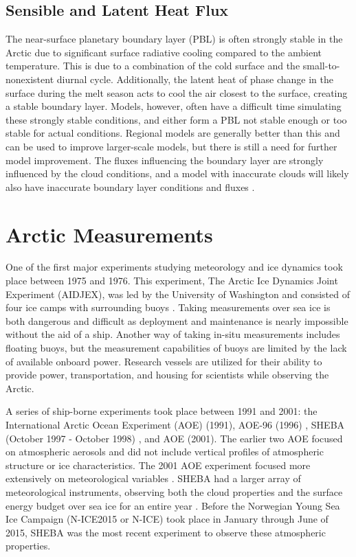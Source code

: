 \subsection{Sensible and Latent Heat Flux}
The near-surface planetary boundary layer (PBL) is often strongly stable in the Arctic due to significant surface radiative cooling compared to the ambient temperature. This is due to a combination of the cold surface and the small-to-nonexistent diurnal cycle. Additionally, the latent heat of phase change in the surface during the melt season acts to cool the air closest to the surface, creating a stable boundary layer. Models, however, often have a difficult time simulating these strongly stable conditions, and either form a PBL not stable enough or too stable for actual conditions. Regional models are generally better than this and can be used to improve larger-scale models, but there is still a need for further model improvement. The fluxes influencing the boundary layer are strongly influenced by the cloud conditions, and a model with inaccurate clouds will likely also have inaccurate boundary layer conditions and fluxes \citep{tjernstrom:2005}. 

\section{Arctic Measurements}
One of the first major experiments studying meteorology and ice dynamics took place between 1975 and 1976. This experiment, The Arctic Ice Dynamics Joint Experiment (AIDJEX), was led by the University of Washington and consisted of four ice camps with surrounding buoys \citep{untersteiner:1980}. Taking measurements over sea ice is both dangerous and difficult as deployment and maintenance is nearly impossible without the aid of a ship. Another way of taking in-situ measurements includes floating buoys, but the measurement capabilities of buoys are limited by the lack of available onboard power. Research vessels are utilized for their ability to provide power, transportation, and housing for scientists while observing the Arctic.

A series of ship-borne experiments took place between 1991 and 2001: the International Arctic Ocean Experiment (AOE) (1991), AOE-96 (1996) \citep{tjernstrom:2004}, SHEBA (October 1997 - October 1998) \citep{uttal:2002}, and AOE (2001). The earlier two AOE focused on atmospheric aerosols and did not include vertical profiles of atmospheric structure or ice characteristics. The 2001 AOE experiment focused more extensively on meteorological variables \citep{tjernstrom:2004}. SHEBA had a larger array of meteorological instruments, observing both the cloud properties and the surface energy budget over sea ice for an entire year \citep{uttal:2002}. Before the Norwegian Young Sea Ice Campaign (N-ICE2015 or N-ICE) took place in January through June of 2015, SHEBA was the most recent experiment to observe these atmospheric properties. 

